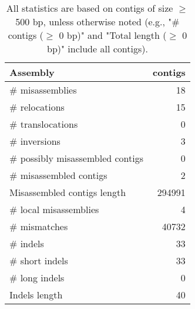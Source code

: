 \documentclass[12pt,a4paper]{article}
\begin{document}
\begin{table}[ht]
\begin{center}
\caption{All statistics are based on contigs of size $\geq$ 500 bp, unless otherwise noted (e.g., "\# contigs ($\geq$ 0 bp)" and "Total length ($\geq$ 0 bp)" include all contigs).}
\begin{tabular}{|l*{1}{|r}|}
\hline
Assembly & contigs \\ \hline
\# misassemblies & 18 \\ \hline
\hspace{5mm}\# relocations & 15 \\ \hline
\hspace{5mm}\# translocations & 0 \\ \hline
\hspace{5mm}\# inversions & 3 \\ \hline
\# possibly misassembled contigs & 0 \\ \hline
\# misassembled contigs & 2 \\ \hline
Misassembled contigs length & 294991 \\ \hline
\# local misassemblies & 4 \\ \hline
\# mismatches & 40732 \\ \hline
\# indels & 33 \\ \hline
\hspace{5mm}\# short indels & 33 \\ \hline
\hspace{5mm}\# long indels & 0 \\ \hline
Indels length & 40 \\ \hline
\end{tabular}
\end{center}
\end{table}
\end{document}
